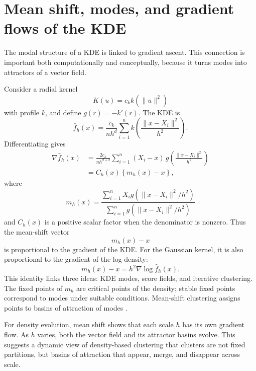 \documentclass[preprint]{imsart}
\theoremstyle{plain}
\theoremstyle{definition}
\newcommand{\fhat}{\widehat f}
\begin{document}
\section{Mean shift, modes, and gradient flows of the KDE}
\label{sec:mean-shift}

The modal structure of a KDE is linked to gradient ascent. This connection is important both computationally and conceptually, because it turns modes into attractors of a vector field.

Consider a radial kernel
\[
  K(u)=c_k k(\|u\|^2)
\]
with profile $k$, and define $g(r)=-k'(r)$. The KDE is
\[
  \fhat_h(x)=\frac{c_k}{nh^d}\sum_{i=1}^n k\left(\frac{\|x-X_i\|^2}{h^2}\right).
\]
Differentiating gives
\begin{align*}
  \nabla \fhat_h(x)
  &= \frac{2c_k}{nh^{d+2}}
     \sum_{i=1}^n (X_i-x)\,g\left(\frac{\|x-X_i\|^2}{h^2}\right)\\
  &= C_h(x)\left\{m_h(x)-x\right\},
\end{align*}
where
\begin{equation*}
  m_h(x)=\frac{\sum_{i=1}^n X_i g(\|x-X_i\|^2/h^2)}{\sum_{i=1}^n g(\|x-X_i\|^2/h^2)}
\end{equation*}
and $C_h(x)$ is a positive scalar factor when the denominator is nonzero. Thus the mean-shift vector
\begin{equation*}
  m_h(x)-x
\end{equation*}
is proportional to the gradient of the KDE. For the Gaussian kernel, it is also proportional to the gradient of the log density:
\begin{equation}
  m_h(x)-x = h^2\nabla\log\fhat_h(x).
  \label{eq:gaussian-mean-shift-score}
\end{equation}
This identity links three ideas: KDE modes, score fields, and iterative clustering. The fixed points of $m_h$ are critical points of the density; stable fixed points correspond to modes under suitable conditions. Mean-shift clustering assigns points to basins of attraction of modes 
\citep{fukunaga_1975_EstimationGradientDensity, cheng_1995_MeanShiftMode, comaniciu_2002_MeanShiftRobust, azzalini_2007_ClusteringNonparametricDensity}.

For density evolution, mean shift shows that each scale $h$ has its own gradient flow. As $h$ varies, both the vector field and its attractor basins evolve. This suggests a dynamic view of density-based clustering that clusters are not fixed partitions, but basins of attraction that appear, merge, and disappear across scale.
\end{document}
